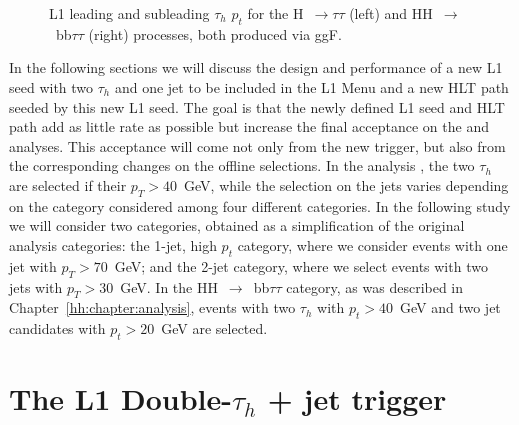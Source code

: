 \documentclass[../main.tex]{subfiles}
\begin{document}
\begin{figure}[h!]
\begin{center}
\end{center}
\caption{L1 leading and subleading $\tau_h$ $p_t$ for the H~$\to\tau\tau$ (left) and HH~$\to$~bb$\tau\tau$ (right) processes, both produced via ggF.}
\label{hh:fig:trig_l1tau_pt}
\end{figure}

In the following sections we will discuss the design and performance of a new L1 seed with two $\tau_h$ and one jet to be included in the L1 Menu and a new HLT path seeded by this new L1 seed. The goal is that the newly defined L1 seed and HLT path add as little rate as possible but increase the final acceptance on the \htt{} and \hhbbtt{} analyses. This acceptance will come not only from the new trigger, but also from the corresponding changes on the offline selections. In the \htt{} analysis \cite{hh:htt_run2}, the two $\tau_h$ are selected if their $p_T > 40$~GeV, while the selection on the jets varies depending on the category considered among four different categories. In the following study we will consider two categories, obtained as a simplification of the original analysis categories: the 1-jet, high $p_t$ category, where we consider events with one jet with $p_T > 70$~GeV; and the 2-jet category, where we select events with two jets with $p_T > 30$~GeV. In the HH~$\to$~bb$\tau\tau$ category, as was described in Chapter~\ref{hh:chapter:analysis}, events with two $\tau_h$ with $p_t>40$~GeV and two jet candidates with $p_t>20$~GeV are selected.



\section{The L1 Double-$\tau_h$ + jet trigger}
\label{hh:sec:l1seeds}
\end{document}
